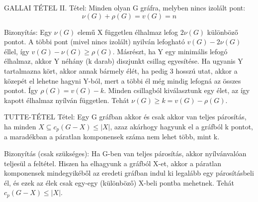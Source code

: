 \documentclass[]{article}
\begin{document}
\begin{framed}
GALLAI TÉTEL II. Tétel: Minden olyan G gráfra, melyben nincs izolált pont:
$$\nu(G) + \rho(G) = v(G) = n$$
\end{framed}
\begin{leftbar}
Bizonyítás: Egy $\nu(G)$ elemű X független élhalmaz lefog $2\nu(G)$ különböző pontot. A többi pont (mivel nincs izolált) nyilván lefogható $v(G) - 2\nu(G)$ éllel, így $v(G) - \nu(G) \geq \rho(G)$. Másrészt, ha Y egy minimális lefogó élhalmaz, akkor Y néhány (k darab) diszjunkt csillag egyesítése. Ha ugyanis Y tartalmazna kört, akkor annak bármely élét, ha pedig 3 hosszú utat, akkor a közepét el lehetne hagyni Y-ból, mert a többi él még mindig lefogná az összes pontot. Így $\rho(G) = v(G) - k$. Minden csillagból kiválasztunk egy élet, az így kapott élhalmaz nyílván független. Tehát $\nu(G) \geq k = v(G) - \rho(G)$.
\end{leftbar}
\begin{framed}
TUTTE-TÉTEL Tétel: Egy G gráfban akkor és csak akkor van teljes párosítás, ha minden $X \subseteq c_p(G - X)\leq |X|$, azaz akárhogy hagyunk el a gráfból k pontot, a maradékban a páratlan komponensek száma nem lehet több, mint k. 
\end{framed}
\begin{leftbar}
Bizonyítás (csak szükséges): Ha G-ben van teljes párosítás, akkor nyílvánvalóan teljesül a feltétel. Hiszen ha elhagyunk a gráfból X-et, akkor a páratlan komponensek mindegyikéből az eredeti gráfban indul ki legalább egy párosításbeli él, és ezek az élek csak egy-egy (különböző) X-beli pontba mehetnek. Tehát $c_p(G - X) \leq |X|$.
\end{leftbar}
\end{document}
